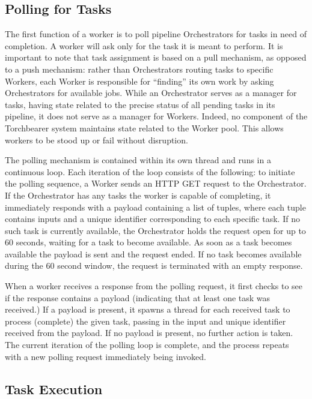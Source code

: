 \subsection{Polling for Tasks}
The first function of a worker is to poll pipeline Orchestrators for tasks in need of completion. A worker will ask only for the task it is meant to perform. It is important to note that task assignment is based on a pull mechanism, as opposed to a push mechanism: rather than Orchestrators routing tasks to specific Workers, each Worker is responsible for “finding” its own work by asking Orchestrators for available jobs. While an Orchestrator serves as a manager for tasks, having state related to the precise status of all pending tasks in its pipeline, it does not serve as a manager for Workers. Indeed, no component of the Torchbearer system maintains state related to the Worker pool. This allows workers to be stood up or fail without disruption.

The polling mechanism is contained within its own thread and runs in a continuous loop. Each iteration of the loop consists of the following: to initiate the polling sequence, a Worker sends an HTTP GET request to the Orchestrator. If the Orchestrator has any tasks the worker is capable of completing, it immediately responds with a payload containing a list of tuples, where each tuple contains inputs and a unique identifier corresponding to each specific task. If no such task is currently available, the Orchestrator holds the request open for up to 60 seconds, waiting for a task to become available. As soon as a task becomes available the payload is sent and the request ended. If no task becomes available during the 60 second window, the request is terminated with an empty response.

When a worker receives a response from the polling request, it first checks to see if the response contains a payload (indicating that at least one task was received.) If a payload is present, it spawns a thread for each received task to process (complete) the given task, passing in the input and unique identifier received from the payload. If no payload is present, no further action is taken. The current iteration of the polling loop is complete, and the process repeats with a new polling request immediately being invoked.

\subsection{Task Execution}

